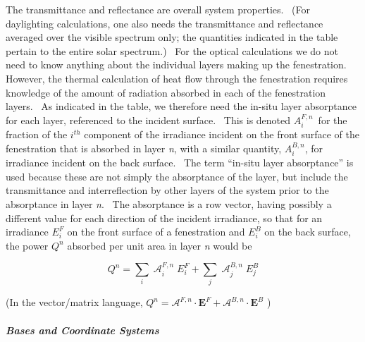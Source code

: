 The transmittance and reflectance are overall system properties.~ (For daylighting calculations, one also needs the transmittance and reflectance averaged over the visible spectrum only; the quantities indicated in the table pertain to the entire solar spectrum.)~ For the optical calculations we do not need to know anything about the individual layers making up the fenestration.~ However, the thermal calculation of heat flow through the fenestration requires knowledge of the amount of radiation absorbed in each of the fenestration layers.~ As indicated in the table, we therefore need the in-situ layer absorptance for each layer, referenced to the incident surface.~ This is denoted $A_i^{F,n}$~for the fraction of the $i^{th}$ component of the irradiance incident on the front surface of the fenestration that is absorbed in layer \emph{n}, with a similar quantity, $A_i^{B,n}$, for irradiance incident on the back surface.~ The term ``in-situ layer absorptance'' is used because these are not simply the absorptance of the layer, but include the transmittance and interreflection by other layers of the system prior to the absorptance in layer \emph{n}.~ The absorptance is a row vector, having possibly a different value for each direction of the incident irradiance, so that for an irradiance $E_{i}^{F}$ on the front surface of a fenestration and $E_{i}^{B}$ on the back surface, the power $Q^{n}$ absorbed per unit area in layer \emph{n} would be

\begin{equation}
{Q^n} = \sum\limits_i {\operatorname{\mathcal{A}}_i^{F,n}E_i^F}  + \sum\limits_j {\operatorname{\mathcal{A}}_j^{B,n}E_j^B}
\label{eq:QnVectorMatrixEquation}
\end{equation}

(In the vector/matrix language, \({Q^n} = {\mathbf{\mathcal{A}}^{F,n}} \cdot {{\mathbf{E}}^F} + {\mathbf{\mathcal{A}}^{B,n}} \cdot {{\mathbf{E}}^B}\) )

\subparagraph{Bases and Coordinate Systems}\label{bases-and-coordinate-systems}

